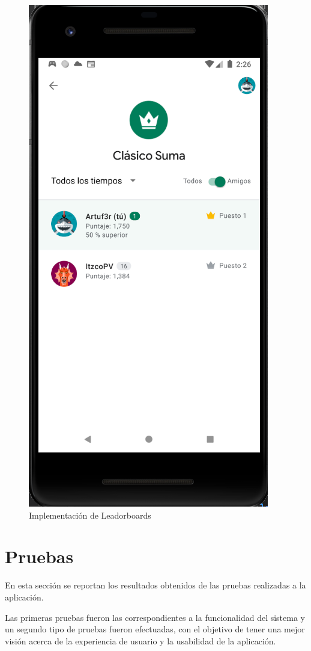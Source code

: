 \documentclass{article}
\begin{document}
\begin{figure}[H]
    \centering
    \includegraphics[scale=0.8]{imgs/Imp/Leaderboards}
    \caption{Implementación de Leadorboards}
    \label{fig:implementacion_10}
\end{figure}


\section{Pruebas}
En esta sección se reportan los resultados obtenidos de las pruebas realizadas a la 
aplicación.

Las primeras pruebas fueron las correspondientes a la funcionalidad del sistema y 
un segundo tipo de pruebas fueron efectuadas, con el objetivo de tener una mejor 
visión acerca de la experiencia de usuario y la usabilidad de la aplicación.
\end{document}
